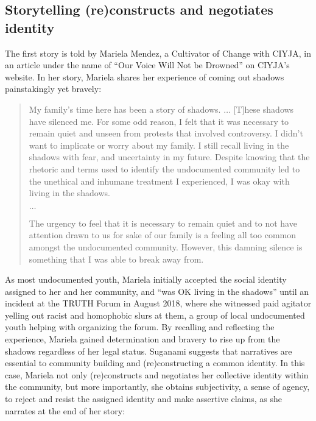 \documentclass[12pt]{article}
\begin{document}
\begin{flushleft}
\subsection*{Storytelling (re)constructs and negotiates identity}

The first story is told by Mariela Mendez, a Cultivator of Change with CIYJA, in an article under the name of ``Our Voice Will Not be Drowned'' on CIYJA's website. In her story, Mariela shares her experience of coming out shadows painstakingly yet bravely:

\begin{quotation}
    \noindent
    My family's time here has been a story of shadows. $\ldots$ [T]hese shadows have silenced me.
    For some odd reason, I felt that it was necessary to remain quiet and unseen from protests that involved controversy. 
    I didn't want to implicate or worry about my family.
    I still recall living in the shadows with fear, and uncertainty in my future.
    Despite knowing that the rhetoric and terms used to identify the undocumented community led to the unethical and inhumane treatment I experienced, I was okay with living in the shadows.

    \noindent $\ldots$
    
    \noindent
    The urgency to feel that it is necessary to remain quiet and to not have attention drawn to us for sake of our family is a feeling all too common amongst the undocumented community.
    However, this damning silence is something that I was able to break away from.
\end{quotation} %

As most undocumented youth, Mariela initially accepted the social identity assigned to her and her community, and ``was OK living in the shadows'' until an incident at the TRUTH Forum in August 2018, where she witnessed paid agitator yelling out racist and homophobic slurs at them, a group of local undocumented youth helping with organizing the forum.
By recalling and reflecting the experience, Mariela gained determination and bravery to rise up from the shadows regardless of her legal status.
Suganami suggests that narratives are essential to community building and (re)constructing a common identity. %
In this case, Mariela not only (re)constructs and negotiates her collective identity within the community, but more importantly, she obtains subjectivity, a sense of agency, to reject and resist the assigned identity and make assertive claims, as she narrates at the end of her story:


\end{flushleft}
\end{document}
